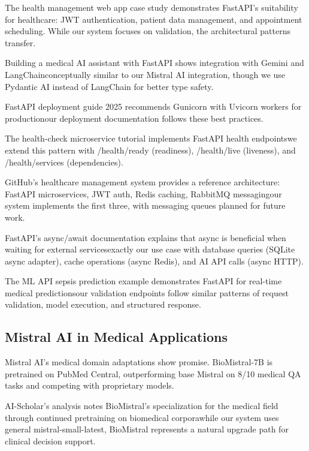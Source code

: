 \documentclass[conference]{IEEEtran}
\begin{document}
The health management web app case study \cite{medium2024healthapp} demonstrates FastAPI's suitability for healthcare: JWT authentication, patient data management, and appointment scheduling. While our system focuses on validation, the architectural patterns transfer.

Building a medical AI assistant with FastAPI \cite{dev2024medicalai} shows integration with Gemini and LangChainconceptually similar to our Mistral AI integration, though we use Pydantic AI instead of LangChain for better type safety.

FastAPI deployment guide 2025 \cite{zestminds2025deployment} recommends Gunicorn with Uvicorn workers for productionour deployment documentation follows these best practices.

The health-check microservice tutorial \cite{dev2024healthcheck} implements FastAPI health endpointswe extend this pattern with /health/ready (readiness), /health/live (liveness), and /health/services (dependencies).

GitHub's healthcare management system \cite{github2024healthcare} provides a reference architecture: FastAPI microservices, JWT auth, Redis caching, RabbitMQ messagingour system implements the first three, with messaging queues planned for future work.

FastAPI's async/await documentation \cite{fastapi2024async} explains that async is beneficial when waiting for external servicesexactly our use case with database queries (SQLite async adapter), cache operations (async Redis), and AI API calls (async HTTP).

The ML API sepsis prediction example \cite{medium2024sepsis} demonstrates FastAPI for real-time medical predictionsour validation endpoints follow similar patterns of request validation, model execution, and structured response.

\subsection{Mistral AI in Medical Applications}

Mistral AI's medical domain adaptations show promise. BioMistral-7B \cite{biomistral2024} is pretrained on PubMed Central, outperforming base Mistral on 8/10 medical QA tasks and competing with proprietary models.

AI-Scholar's analysis \cite{aischolar2024biomistral} notes BioMistral's specialization for the medical field through continued pretraining on biomedical corporawhile our system uses general mistral-small-latest, BioMistral represents a natural upgrade path for clinical decision support.
\end{document}
